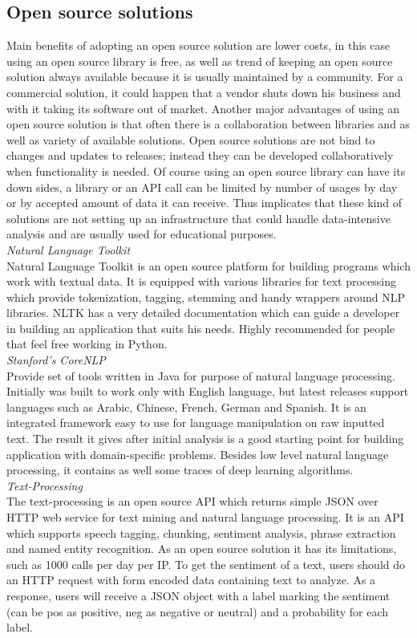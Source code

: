 \subsection*{Open source solutions}
Main benefits of adopting an open source solution are lower costs, in this case using an open source library is free, as well as trend of keeping an open source solution always available because it is usually maintained by a community. For a commercial solution, it could happen that a vendor shuts down his business and with it taking its software out of market. Another major advantages of using an open source solution is that often there is a collaboration between libraries and as well as variety of available solutions. Open source solutions are not bind to changes and updates to releases; instead they can be developed collaboratively when functionality is needed. Of course using an open source library can have its down sides, a library or an API call can be limited by number of usages by day or by accepted amount of data it can receive. Thus implicates that these kind of solutions are not setting up an infrastructure that could handle data-intensive analysis and are usually used for educational purposes.\\
\textit{Natural Language Toolkit\\}
Natural Language Toolkit is an open source platform for building programs which work with textual data. It is equipped with various libraries for text processing which provide tokenization, tagging, stemming and handy wrappers around NLP libraries. NLTK has a very detailed documentation which can guide a developer in building an application that suits his needs. Highly recommended for people that feel free working in Python.\\
\textit{Stanford’s CoreNLP\\}
Provide set of tools written in Java for purpose of natural language processing. Initially was built to work only with English language, but latest releases support languages such as Arabic, Chinese, French, German and Spanish. It is an integrated framework easy to use for language manipulation on raw inputted text. The result it gives after initial analysis is a good starting point for building application with domain-specific problems. Besides low level natural language processing, it contains as well some traces of deep learning algorithms.\\
\textit{Text-Processing\\}
The text-processing is an open source API which returns simple JSON over HTTP web service for text mining and natural language processing. It is an API which supports speech tagging, chunking, sentiment analysis, phrase extraction and named entity recognition. As an open source solution it has its limitations, such as 1000 calls per day per IP. 
To get the sentiment of a text, users should do an HTTP request with form encoded data containing text to analyze. As a response, users will receive a JSON object with a label marking the sentiment (can be pos as positive, neg as negative or neutral) and a probability for each label.\\

